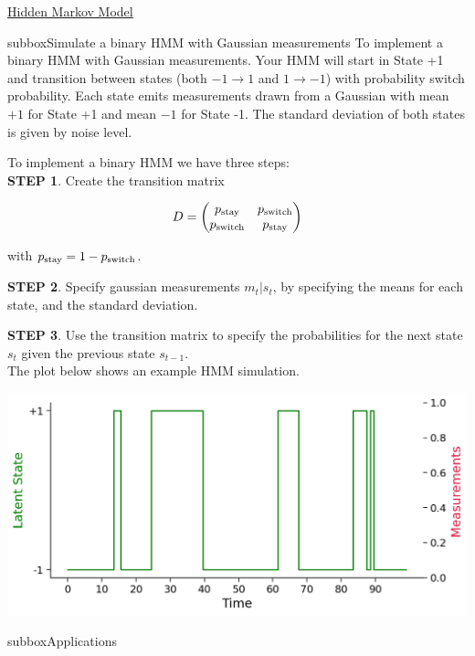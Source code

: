 \begin{textbox}{\href{http://instructor.compneuro.neuromatch.io/tutorials/W3D2_HiddenDynamics/instructor/W3D2_Tutorial2.html}{Hidden Markov Model }   }

\begin{subbox}{subbox}{Simulate a binary HMM with Gaussian measurements}
\scriptsize
To implement a binary HMM with Gaussian measurements. Your HMM will start in State +1 and transition between states (both $-1 \rightarrow 1$ and $1 \rightarrow -1$) with probability switch probability. Each state emits measurements drawn from a Gaussian with mean $+1$ for State +1 and mean $-1$ for State -1. The standard deviation of both states is given by noise level.

To implement a binary HMM we have three steps:\\
\textbf{STEP 1}. Create the transition matrix  

\begin{equation}
D = 
\begin{pmatrix}
p_{\rm stay} & p_{\rm switch} \\
p_{\rm switch} & p_{\rm stay} \\
\end{pmatrix}
\end{equation}

with $p_{\rm stay} = 1 - p_{\rm switch}$. 

\textbf{STEP 2}. Specify gaussian measurements $m_t | s_t$, by specifying the means for each state, and the standard deviation.

\textbf{STEP 3}. Use the transition matrix to specify the probabilities for the next state $s_t$ given the previous state $s_{t-1}$.\\

The plot below shows an example HMM simulation. 
\begin{center}
    
\includegraphics[scale=0.25]{Figures/HD/HD_Figure3.png}
\end{center}
\end{subbox}
\begin{subbox}{subbox}{Applications}
\scriptsize


\end{subbox}
\end{textbox}
